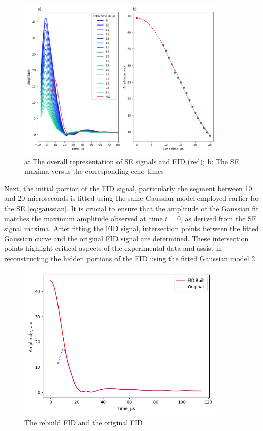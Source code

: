 \documentclass[a4paper,12pt]{article}
\begin{document}
\begin{figure}[H]
  \centering
  \includegraphics[width=10cm]{images/FID_SE.png}
  \caption{a: The overall representation of SE signals and FID (red); b: The SE maxima versus the corresponding echo times}
  \label{fig:FID_SE}
\end{figure}

Next, the initial portion of the FID signal, particularly the segment between 10 and 20 microseconds is fitted using the same Gaussian model employed earlier for the SE \cref{eq:gaussian}. 
It is crucial to ensure that the amplitude of the Gaussian fit matches the maximum amplitude observed at time $t = 0$, as derived from the SE signal maxima.
After fitting the FID signal, intersection points between the fitted Gaussian curve and the original FID signal are determined. 
These intersection points highlight critical aspects of the experimental data and assist in reconstructing the hidden portions of the FID using the fitted Gaussian model \cref{fig:Rebuild_FID}.

\begin{figure}[H]
  \centering
  \includegraphics[width=10cm]{images/Rebuild_FID.png}
  \caption{The rebuild FID and the original FID}
  \label{fig:Rebuild_FID}
\end{figure}
\end{document}
